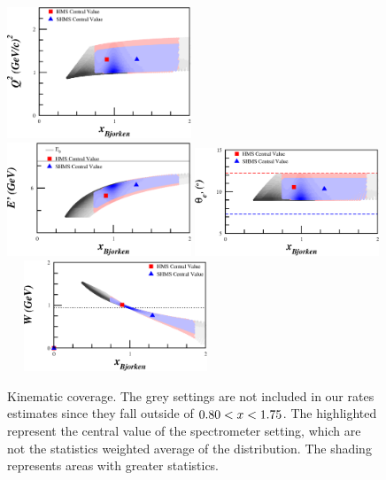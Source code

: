 \begin{figure}
\begin{center}
\includegraphics[width=0.49\textwidth]{figs/kine/Pzz_30_q2.eps}~~ \includegraphics[width=0.49\textwidth]{figs/kine/Pzz_30_eprime.eps}
\includegraphics[width=0.49\textwidth]{figs/kine/Pzz_30_theta_eprime.eps}~~ \includegraphics[width=0.49\textwidth]{figs/kine/Pzz_30_w.eps}
\caption{\label{kincov} Kinematic coverage.  The grey settings are not included in our rates estimates since they fall outside of $0.80 < x < 1.75$. The highlighted represent the central value of the spectrometer setting, which are not the statistics weighted average of the distribution. The shading represents areas with greater statistics.}
\end{center}
\end{figure}


